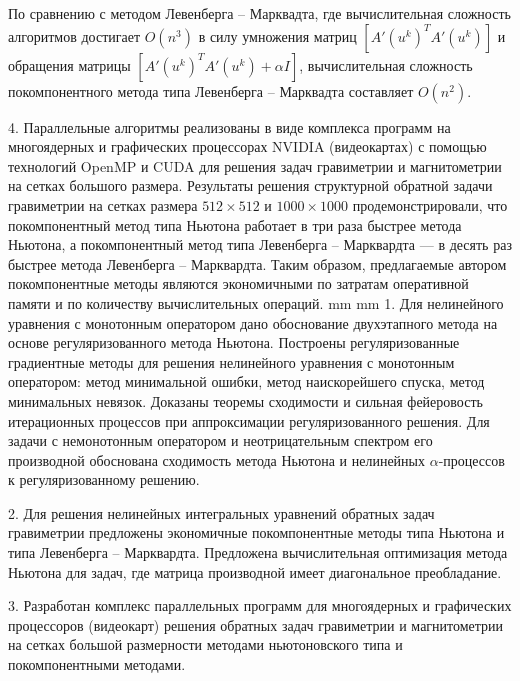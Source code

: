 \documentclass[%
autoref,     %
href,        %
facsimile,   %
colorlinks,  %
]{disser}
\begin{document}
По сравнению с методом Левенберга -- Марквадта, где вычислительная сложность алгоритмов достигает $O(n^3)$ в силу умножения матриц $[A'(u^k)^T A'(u^k)]$ и обращения матрицы $[A'(u^k)^T A'(u^k)+\alpha I]$, вычислительная сложность покомпонентного метода типа Левенберга -- Марквадта составляет $O(n^2)$.

4. Параллельные алгоритмы реализованы в виде комплекса программ на многоядерных и графических процессорах NVIDIA (видеокартах) с помощью технологий OpenMP и CUDA для решения задач гравиметрии и магнитометрии на сетках большого размера. 
Результаты решения структурной обратной задачи гравиметрии на сетках размера $512\times 512$ и $1000\times 1000$ продемонстрировали, что покомпонентный метод типа Ньютона работает в три раза быстрее метода Ньютона, а покомпонентный метод типа Левенберга -- Марквардта --- в десять раз быстрее метода Левенберга -- Марквардта. Таким образом, предлагаемые автором покомпонентные методы являются экономичными по затратам оперативной памяти и по количеству вычислительных операций.
 mm
 mm
1. Для нелинейного уравнения с монотонным оператором дано обоснование двухэтапного метода на основе регуляризованного метода Ньютона. 
Построены %
регуляризованные градиентные методы для решения нелинейного уравнения с монотонным оператором: метод минимальной ошибки, метод наискорейшего спуска, метод минимальных невязок. Доказаны теоремы сходимости и сильная фейеровость итерационных процессов при аппроксимации регуляризованного решения. Для задачи с немонотонным оператором и неотрицательным спектром его производной обоснована сходимость метода  Ньютона и нелинейных $\alpha$-процессов к регуляризованному решению.

2. Для решения нелинейных интегральных уравнений обратных задач гравиметрии предложены экономичные покомпонентные методы 
типа Ньютона и типа Левенберга – Марквардта. Предложена вычислительная оптимизация метода 
Ньютона для задач, где матрица производной имеет диагональное преобладание. 

3. Разработан комплекс параллельных программ для многоядерных и графических процессоров (видеокарт) решения обратных задач гравиметрии и магнитометрии на сетках большой размерности методами ньютоновского типа и покомпонентными методами.
\end{document}
